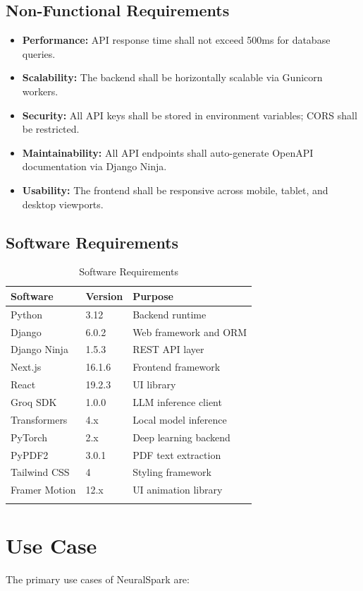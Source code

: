 \documentclass[12pt,a4paper]{report}
\begin{document}
\subsection{Non-Functional Requirements}
\begin{itemize}
    \item \textbf{Performance:} API response time shall not exceed 500ms for database queries.
    \item \textbf{Scalability:} The backend shall be horizontally scalable via Gunicorn workers.
    \item \textbf{Security:} All API keys shall be stored in environment variables; CORS shall be restricted.
    \item \textbf{Maintainability:} All API endpoints shall auto-generate OpenAPI documentation via Django Ninja.
    \item \textbf{Usability:} The frontend shall be responsive across mobile, tablet, and desktop viewports.
\end{itemize}

\subsection{Software Requirements}
\begin{longtable}{@{}p{4cm}p{3cm}p{6cm}@{}}
\toprule
\textbf{Software} & \textbf{Version} & \textbf{Purpose} \\
\midrule
\endhead
Python & 3.12 & Backend runtime \\
Django & 6.0.2 & Web framework and ORM \\
Django Ninja & 1.5.3 & REST API layer \\
Next.js & 16.1.6 & Frontend framework \\
React & 19.2.3 & UI library \\
Groq SDK & 1.0.0 & LLM inference client \\
Transformers & 4.x & Local model inference \\
PyTorch & 2.x & Deep learning backend \\
PyPDF2 & 3.0.1 & PDF text extraction \\
Tailwind CSS & 4 & Styling framework \\
Framer Motion & 12.x & UI animation library \\
\bottomrule
\caption{Software Requirements}
\label{tab:software}
\end{longtable}

\section{Use Case}
The primary use cases of NeuralSpark are:
\end{document}
